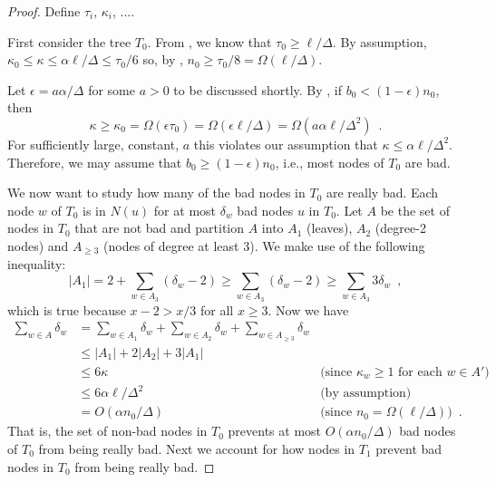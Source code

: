 \documentclass{patmorin}
\begin{document}
\begin{proof}
  Define $\tau_i$, $\kappa_i$, ....

  First consider the tree $T_0$.  From ,
  we know that $\tau_0\ge \ell/\Delta$.  By assumption,
  $\kappa_0\le\kappa\le \alpha\ell/\Delta \le \tau_0/6$
  so, by , $n_0 \ge
  \tau_0/8=\Omega(\ell/\Delta)$.
  
  Let $\epsilon=a\alpha/\Delta$ for some $a>0$ to be discussed shortly.
  By , if $b_0 < (1-\epsilon) n_0$, then
  \[ 
      \kappa \ge \kappa_0 = \Omega(\epsilon\tau_0)
               = \Omega(\epsilon\ell/\Delta)
               = \Omega(a\alpha\ell/\Delta^2) 
               \enspace .
  \]
  For sufficiently large, constant, $a$ this violates our assumption
  that $\kappa \le \alpha\ell/\Delta^2$.
  Therefore, we may assume that $b_0\ge (1-\epsilon)n_0$, i.e., most nodes
  of $T_0$ are bad.

  We now want to study how many of the bad nodes in $T_0$ are really bad.
  Each node $w$ of $T_0$ is in $N(u)$ for at most $\delta_w$ bad nodes
  $u$ in $T_0$.  Let $A$ be the set of nodes in $T_0$ that are not
  bad and partition $A$ into $A_1$ (leaves), $A_2$ (degree-2 nodes)
  and $A_{\ge 3}$ (nodes of degree at least 3).  We make use of the
  following inequality:
  \[  |A_1| = 2 + \sum_{w\in A_3}(\delta_w-2) \ge \sum_{w\in A_3}(\delta_w-2)
    \ge \sum_{w\in A_3}3\delta_w \enspace , \] 
  which is true because $x-2>x/3$ for all $x\ge 3$. 
  Now we have 
  \begin{align*}
   \sum_{w\in A}\delta_w 
    & = \sum_{w\in A_1}\delta_w 
         + \sum_{w\in A_2}\delta_w 
         + \sum_{w\in A_{\ge 3}}\delta_w \\
    & \le |A_1| + 2|A_2| + 3|A_1| \\
    & \le 6\kappa & \text{(since $\kappa_w\ge 1$ for each $w\in A'$)}\\
    & \le 6\alpha\ell/\Delta^2 & \text{(by assumption)}\\
    & = O(\alpha n_0/\Delta) & \text{(since $n_0=\Omega(\ell/\Delta)$)}\enspace .
  \end{align*}
  That is, the set of non-bad nodes in $T_0$ prevents at most $O(\alpha
  n_0/\Delta)$ bad nodes of $T_0$ from being really bad. Next we account
  for how nodes in $T_1$ prevent bad nodes in $T_0$ from being really bad.


\end{proof}
\end{document}
